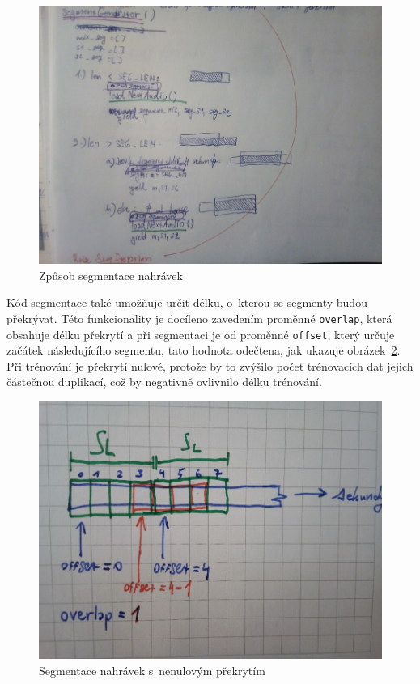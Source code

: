\begin{figure}[H]
    \centering
    \includegraphics[scale=0.30]{obrazky-figures/segmentation.jpg}
    \caption{\label{fig:generovani_segmentu}Způsob segmentace nahrávek}
\end{figure}


Kód segmentace také umožňuje určit délku, o~kterou se segmenty budou překrývat. Této funkcionality je docíleno zavedením proměnné \texttt{overlap}, která obsahuje délku překrytí a při segmentaci je od proměnné \texttt{offset}, který určuje začátek následujícího segmentu, tato hodnota odečtena, jak ukazuje obrázek~\ref{fig:segment_overlap}. Při trénování je překrytí nulové, protože by to zvýšilo počet trénovacích dat jejich částečnou duplikací, což by negativně ovlivnilo délku trénování.

\begin{figure}[H]
    \centering
    \includegraphics[scale=0.25]{obrazky-figures/segment_overlap.jpg}
    \caption{\label{fig:segment_overlap}Segmentace nahrávek s~nenulovým překrytím}
\end{figure}



